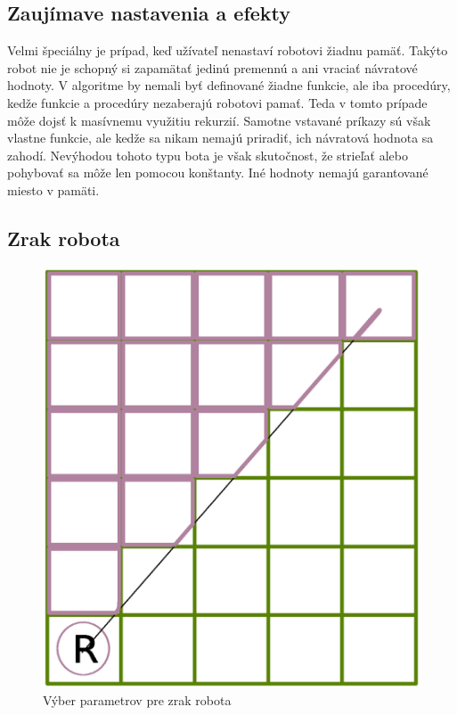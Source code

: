 \subsection{Zaujímave nastavenia a efekty}

Velmi špeciálny je prípad, keď užívateľ nenastaví robotovi žiadnu pamäť. Takýto robot nie je schopný si zapamätať jedinú premennú a ani vraciať návratové hodnoty. V algoritme by nemali byť definované žiadne funkcie, ale iba procedúry, kedže funkcie a procedúry nezaberajú robotovi pamať. Teda v tomto prípade môže dojsť k masívnemu využitiu rekurzií. Samotne vstavané príkazy sú však vlastne funkcie, ale kedže sa nikam nemajú priradiť, ich návratová hodnota sa zahodí. Nevýhodou tohoto typu bota je však skutočnost, že strieľať alebo pohybovať sa môže len pomocou konštanty. Iné hodnoty nemajú garantované miesto v pamäti.

\subsection{Zrak robota}

\begin{figure}
\centering
\includegraphics[totalheight=0.2\textheight,width=.6\textwidth]{chooseVisible}
\caption {Výber parametrov pre zrak robota}
\label{choosing}
\end{figure}


